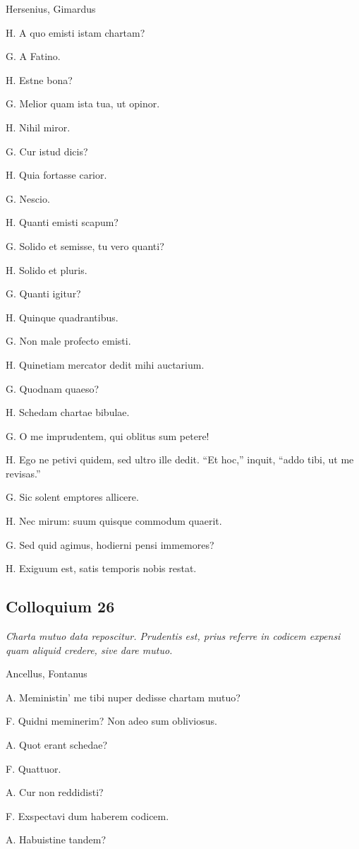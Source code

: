 \documentclass{article}
\begin{document}
Hersenius, Gimardus

H. A quo emisti istam chartam?

G. A Fatino.

H. Estne bona?

G. Melior quam ista tua, ut opinor.

H. Nihil miror.

G. Cur istud dicis?

H. Quia fortasse carior.

G. Nescio.

H. Quanti emisti scapum?

G. Solido et semisse, tu vero quanti?

H. Solido et pluris.

G. Quanti igitur?

H. Quinque quadrantibus.

G. Non male profecto emisti.

H. Quinetiam mercator dedit mihi auctarium.

G. Quodnam quaeso?

H. Schedam chartae bibulae.

G. O me imprudentem, qui oblitus sum petere!

H. Ego ne petivi quidem, sed ultro ille dedit. ``Et hoc,'' inquit, ``addo tibi, ut me revisas.''

G. Sic solent emptores allicere.

H. Nec mirum: suum quisque commodum quaerit.

G. Sed quid agimus, hodierni pensi immemores?

H. Exiguum est, satis temporis nobis restat.

\subsection{Colloquium 26}
\emph{Charta mutuo data reposcitur. Prudentis est, prius referre in codicem expensi quam aliquid credere, sive dare mutuo.}

Ancellus, Fontanus

A. Meministin' me tibi nuper dedisse chartam mutuo?

F. Quidni meminerim? Non adeo sum obliviosus.

A. Quot erant schedae?

F. Quattuor.

A. Cur non reddidisti?

F. Exspectavi dum haberem codicem.

A. Habuistine tandem?
\end{document}
